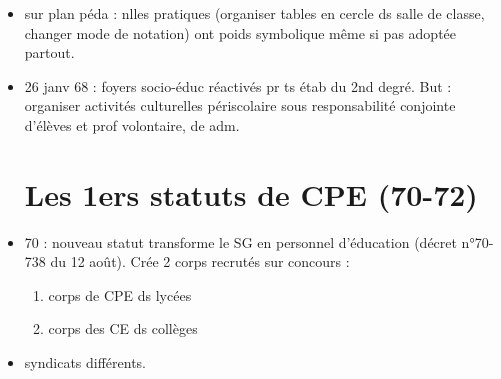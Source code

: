 \documentclass[12pt]{report}
\begin{document}
\begin{itemize}
\item sur plan péda : nlles pratiques (organiser tables en cercle ds salle de classe, changer mode de notation) ont poids symbolique même si pas adoptée partout. \\

\item 26 janv 68 : foyers socio-éduc réactivés pr ts étab du 2nd degré. But : organiser activités culturelles périscolaire sous responsabilité conjointe d'élèves et prof volontaire, de adm. \\


\section{Les 1ers statuts de CPE (70-72)}

\item 70 : nouveau statut transforme le SG en personnel d'éducation (décret n°70-738 du 12 août).  Crée 2 corps recrutés sur concours : 
\begin{enumerate}
\item corps de CPE ds lycées \\
\item corps des CE ds collèges \\
\end{enumerate}

 \item syndicats différents. \\
 

\end{itemize}
\end{document}
